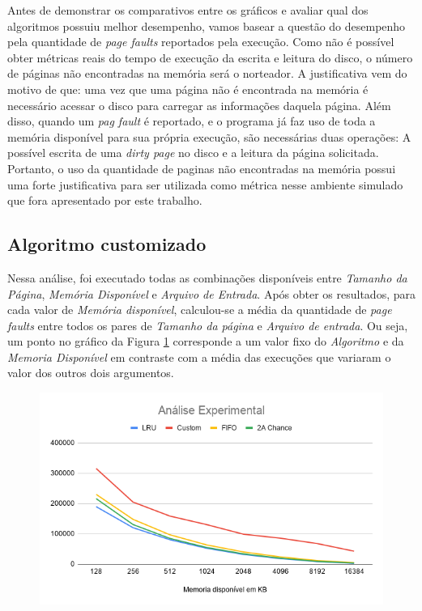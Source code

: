 Antes de demonstrar os comparativos entre os gráficos e avaliar qual dos
algoritmos possuiu melhor desempenho, vamos basear a questão do desempenho
pela quantidade de \textit{page faults} reportados pela execução.
Como não é possível obter métricas reais do tempo de execução da escrita e
leitura do disco, o número de páginas não encontradas na memória será o
norteador.
A justificativa vem do motivo de que: uma vez que uma página não é encontrada
na memória é necessário acessar o disco para carregar as informações daquela
página.
Além disso, quando um \textit{pag fault} é reportado, e o programa já faz uso
de toda a memória disponível para sua própria execução, são necessárias duas
operações: A possível escrita de uma \textit{dirty page} no disco e a leitura
da página solicitada.
Portanto, o uso da quantidade de paginas não encontradas na memória possui uma
forte justificativa para ser utilizada como métrica nesse ambiente simulado
que fora apresentado por este trabalho.


\subsection{Algoritmo customizado}
Nessa análise, foi executado todas as combinações disponíveis entre
\textit{Tamanho da Página}, \textit{Memória Disponível} e
\textit{Arquivo de Entrada}. Após obter os resultados, para cada valor
de \textit{Memória disponível}, calculou-se a média da quantidade de 
\textit{page faults} entre todos os pares de \textit{Tamanho da página}
e \textit{Arquivo de entrada}.
Ou seja, um ponto no gráfico da Figura \ref{fig:grafico1} corresponde a um valor fixo
do \textit{Algoritmo} e da \textit{Memoria Disponível} em contraste com
a média das execuções que variaram o valor dos outros dois argumentos.

\begin{figure}[h]
	\begin{center}
		\includegraphics[scale=0.7]{Figuras/img1.png}
	\end{center}
	\caption{\label{fig:grafico1} }
\end{figure}

